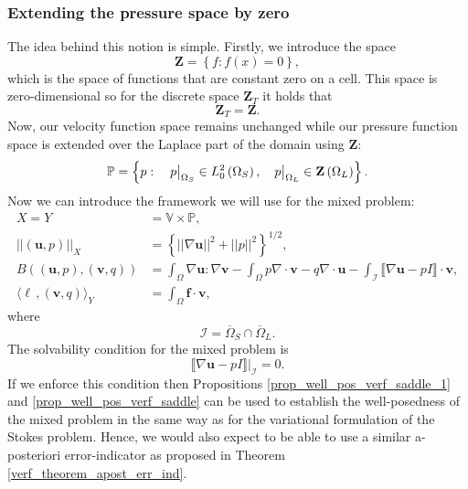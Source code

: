 \documentclass[12pt,a4paper]{article}
\theoremstyle{definition}
\newcommand\restr[2]{{%
		\left.\kern-\nulldelimiterspace %
		#1 %
		\vphantom{\big|} %
		\right|_{#2} %
}}
\begin{document}
\subsubsection{Extending the pressure space by zero}
The idea behind this notion is simple.  Firstly, we introduce the space  
\begin{equation}
\textbf{Z}=\left\lbrace  f: f\left(x\right)=0 \right\rbrace,
\end{equation}
which is the space of functions that are constant zero on a cell.  This space is zero-dimensional so for the discrete space $\textbf{Z}_T$ it holds that
\begin{equation}
\textbf{Z}_T=\textbf{Z}.\nonumber 
\end{equation}
 Now, our velocity function space remains unchanged while our pressure function space is extended over the Laplace part of the domain using $\textbf{Z}$:
\begin{equation}\label{extended_pressure_space}
\mathbb{P}=\left\lbrace p: \quad \restr{p}{{\Omega_S}}\in L^2_0\left(\Omega_S\right),\quad  \restr{p}{{\Omega_L}}\in\textbf{Z}\left(\Omega_L\right)\right\rbrace.
\end{equation}
Now we can introduce the framework we will use for the mixed problem:
\begin{equation}
\begin{aligned}
X=Y&=\mathbb{V}\times \mathbb{P},\\
\left|\left|\left(\textbf{u},p\right)\right|\right|_X&=\left\lbrace \left|\left|\nabla\textbf{u}\right|\right|^2 + \left|\left|p\right|\right|^2\right\rbrace^{1/2},\\
B\left(\left(\textbf{u},p\right),\left(\textbf{v},q\right)\right)&=\int_{\Omega}\nabla \textbf{u} : \nabla \textbf{v} - \int_{\Omega} p \nabla\cdot\textbf{v} -q \nabla\cdot\textbf{u}-\int_{\mathcal{I}} \llbracket\nabla\textbf{u}-pI\rrbracket\cdot\textbf{v},\\
\langle \ell\,,\left(\textbf{v},q\right) \rangle_Y &= \int_{\Omega}\textbf{f}\cdot \textbf{v},
\end{aligned}
\end{equation}
where 
\begin{equation}
\mathcal{I}=\overline{\Omega}_S\cap\overline{\Omega}_L.
\end{equation}
The solvability condition for the mixed problem is 
\begin{equation}
{\llbracket\nabla\textbf{u}-pI\rrbracket}|_{\mathcal{I}}=0.
\end{equation}
If we enforce this condition then Propositions \ref{prop_well_pos_verf_saddle_1} and \ref{prop_well_pos_verf_saddle} can be used to establish the well-posedness of the mixed problem in the same way as for the variational formulation of the Stokes problem.   Hence, we would also expect to be able to use a similar a-posteriori error-indicator as proposed in Theorem \ref{verf_theorem_apost_err_ind}. 
\end{document}
